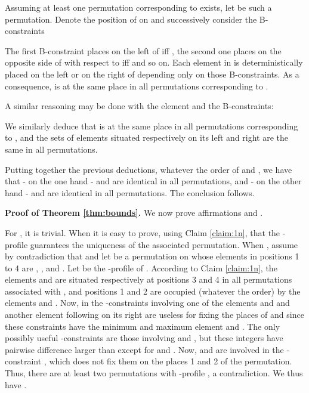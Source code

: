 \documentclass{article}
\begin{document}
 Assuming at least one permutation corresponding to  exists, let  be such
a permutation. Denote  the position of  on  and successively consider the B-constraints

 

\noindent The first B-constraint places
 on the left of  iff , the second one places  on the opposite side of  with respect to
 iff  and so on. Each element in  is deterministically placed on the
left or on the right of  depending only on those B-constraints.  As a consequence,  is at the same place 
 in all permutations corresponding to .

A similar reasoning may be done with the element  and the B-constraints: 

 

\noindent We similarly deduce that  is at the same place  in all permutations corresponding to ,
and the sets of elements situated respectively on its left and right are the same in all permutations.

Putting together the previous deductions, whatever the order of  and ,
we have that - on the one hand -  and  are identical in all permutations, and
- on the other hand -  and  are identical in all permutations. The conclusion follows. 
\bigskip


{\bf Proof of Theorem \ref{thm:bounds}.}  We now prove affirmations  and .

 For , it is trivial.
When  it is easy to prove,  using Claim \ref{claim:1n}, that the -profile guarantees 
the uniqueness of the associated permutation.
When , assume by contradiction that   and  let  be a permutation on  
whose elements in positions 1 to 4 are , ,  and .
Let  be the -profile of .
According to Claim  \ref{claim:1n}, the elements  and  are situated respectively at positions
3 and 4 in all permutations associated with , and positions 1 and 2 are occupied (whatever the order) 
by the elements  and . Now, in  the 
-constraints involving one of the elements  and   and another
element following  on its right are useless for fixing the places of  and  
since these constraints have the minimum and maximum element  and .
The only possibly useful -constraints are those involving  and , but these 
integers have pairwise difference larger than  except for  and . Now,   and  are 
involved in the -constraint , which does not fix them on the places 1 and 2 of
the permutation. Thus, there are at least two permutations with -profile , a contradiction. 
We thus have .
 
\end{document}

